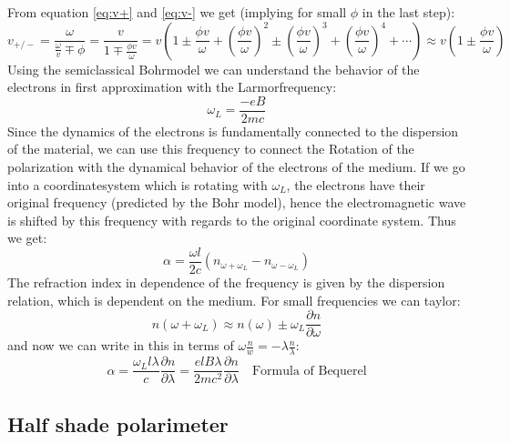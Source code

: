 From equation \eqref{eq:v+} and \eqref{eq:v-} we get (implying for small $\phi$ in the last step):
\begin{equation}
v_{+/-} = \frac{\omega}{\frac{\omega}{v} \mp \phi} = \frac{v}{1 \mp \frac{\phi v}{\omega}} 
= v \left ( 1 \pm \frac{\phi v}{\omega}+ \left (\frac{\phi v}{\omega} \right)^2
\pm \left (\frac{\phi v}{\omega} \right)^3 + \left (\frac{\phi v}{\omega} \right)^4+ \cdots \right)
\approx v \left  (1 \pm \frac{\phi v}{\omega} \right )
\end{equation}
Using the semiclassical Bohrmodel we can understand the behavior of the electrons in 
first approximation with the Larmorfrequency:
\begin{equation}
\omega_L = \frac{-e B}{2 m c}
\end{equation}
Since the dynamics of the electrons is fundamentally connected to the dispersion of the material,
we can use this frequency to connect the Rotation of the polarization with the dynamical behavior 
of the electrons of the medium. If we go into a coordinatesystem which is rotating with $\omega_L$,
the electrons have their original frequency (predicted by the Bohr model), hence the electromagnetic
wave is shifted by this frequency with regards to the original coordinate system. Thus we get:
\begin{equation}
\alpha = \frac{\omega l}{2c} \left (n_{\omega + \omega_L} - n_{\omega - \omega_L}\right )  
\end{equation}
The refraction index in dependence of the frequency is given by the dispersion relation, which is 
dependent on the medium. For small frequencies we can taylor: 
\begin{equation}
n(\omega + \omega_L) \approx n(\omega) \pm \omega_L \frac{\partial n}{\partial \omega}
\end{equation}
and now we can write in this in terms of $\omega \frac{n}{w} = -\lambda \frac{n}{\lambda}$:
\begin{equation}
\alpha = \frac{\omega_L l \lambda}{c} \frac{\partial n}{\partial \lambda} = 
\frac{e l B \lambda}{2m c^2} \frac{\partial n}{\partial \lambda} \quad \text{Formula of Bequerel}
\end{equation}

\subsection{Half shade polarimeter}

